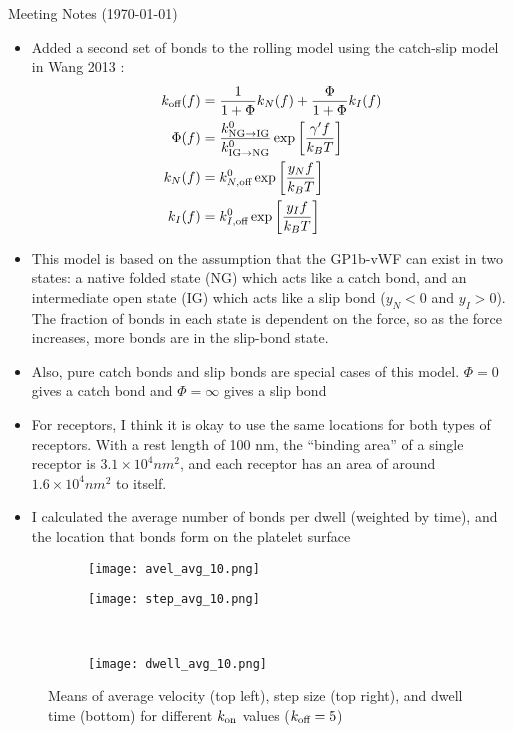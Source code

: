 \documentclass{article}
\newcommand{\tn}{\textnormal}
\begin{document}
\pagestyle{plain}

\begin{center}
  {\Large Meeting Notes (\today)}
\end{center}

\begin{itemize}
\item Added a second set of bonds to the rolling model using the
  catch-slip model in Wang 2013 \cite{Wang2013}:
  \begin{align}
    k_\tn{off}(f) &= \frac{1}{1 + \Phi} k_N(f) + \frac{\Phi}{1 + \Phi}
                    k_I(f) \\
    \Phi(f) &=
              \frac{k_{\tn{NG}\rightarrow\tn{IG}}^0}
              {k_{\tn{IG}\rightarrow\tn{NG}}^0}
              \exp \left[\frac{\gamma' f}{k_B T} \right] \\
    k_N(f) &= k_{N,\tn{off}}^0 \exp \left[\frac{y_N f}{k_B T}\right]
    \\
    k_I(f) &= k_{I,\tn{off}}^0 \exp \left[\frac{y_I f}{k_B T}\right]
  \end{align}
\item This model is based on the assumption that the GP1b-vWF can
  exist in two states: a native folded state (NG) which acts like a
  catch bond, and an intermediate open state (IG) which acts like a
  slip bond ($y_N < 0$ and $y_I > 0$). The fraction of bonds in each
  state is dependent on the force, so as the force increases, more
  bonds are in the slip-bond state.
\item Also, pure catch bonds and slip bonds are special cases of this
  model. $\Phi = 0$ gives a catch bond and $\Phi = \infty$ gives a
  slip bond
\item For receptors, I think it is okay to use the same locations for
  both types of receptors. With a rest length of 100 nm, the
  ``binding area'' of a single receptor is $3.1 \times 10^4 nm^2$, and
  each receptor has an area of around $1.6 \times 10^4 nm^2$ to
  itself.
\item I calculated the average number of bonds per dwell
  (weighted by time), and the location that bonds form on the platelet
  surface
\end{itemize}

\begin{figure}[h]
  \centering
  \begin{subfigure}{0.49\textwidth}
    \texttt{[image: avel\_avg\_10.png]}
  \end{subfigure}
  \hfill
  \begin{subfigure}{0.49\textwidth}
    \texttt{[image: step\_avg\_10.png]}
  \end{subfigure}
  \\
  \begin{subfigure}{0.49\textwidth}
    \texttt{[image: dwell\_avg\_10.png]}
  \end{subfigure}
  \label{fig:stats10}
  \caption{Means of average velocity (top left), step size (top
    right), and dwell time (bottom) for different $k_\tn{on}$
    values ($k_\tn{off} = 5$)}
\end{figure}
\end{document}
